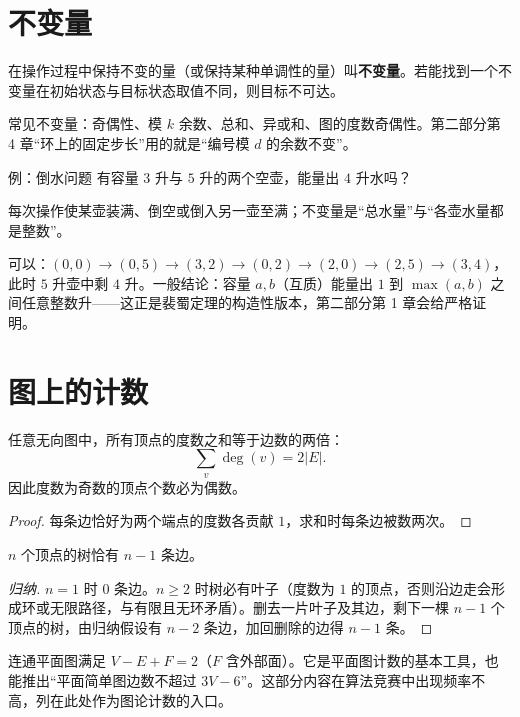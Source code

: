\section{不变量}
\begin{definition}[不变量]
在操作过程中保持不变的量（或保持某种单调性的量）叫\textbf{不变量}。若能找到一个不变量在初始状态与目标状态取值不同，则目标不可达。
\end{definition}
常见不变量：奇偶性、模 $k$ 余数、总和、异或和、图的度数奇偶性。第二部分第 4 章“环上的固定步长”用的就是“编号模 $d$ 的余数不变”。

\begin{problem}{例：倒水问题}
有容量 $3$ 升与 $5$ 升的两个空壶，能量出 $4$ 升水吗？
\end{problem}
\hint 每次操作使某壶装满、倒空或倒入另一壶至满；不变量是“总水量”与“各壶水量都是整数”。

\sol 可以：$(0,0)\to(0,5)\to(3,2)\to(0,2)\to(2,0)\to(2,5)\to(3,4)$，此时 $5$ 升壶中剩 $4$ 升。一般结论：容量 $a,b$（互质）能量出 $1$ 到 $\max(a,b)$ 之间任意整数升——这正是裴蜀定理的构造性版本，第二部分第 1 章会给严格证明。

\section{图上的计数}
\begin{theorem}[握手引理]
任意无向图中，所有顶点的度数之和等于边数的两倍：
\[
\sum_v\deg(v)=2|E|.
\]
因此度数为奇数的顶点个数必为偶数。
\end{theorem}
\begin{proof}
每条边恰好为两个端点的度数各贡献 $1$，求和时每条边被数两次。
\end{proof}

\begin{theorem}[树的边数]
$n$ 个顶点的树恰有 $n-1$ 条边。
\end{theorem}
\begin{proof}[归纳]
$n=1$ 时 $0$ 条边。$n\ge2$ 时树必有叶子（度数为 $1$ 的顶点，否则沿边走会形成环或无限路径，与有限且无环矛盾）。删去一片叶子及其边，剩下一棵 $n-1$ 个顶点的树，由归纳假设有 $n-2$ 条边，加回删除的边得 $n-1$ 条。
\end{proof}

\begin{tip}[欧拉公式]
连通平面图满足 $V-E+F=2$（$F$ 含外部面）。它是平面图计数的基本工具，也能推出“平面简单图边数不超过 $3V-6$”。这部分内容在算法竞赛中出现频率不高，列在此处作为图论计数的入口。
\end{tip}

